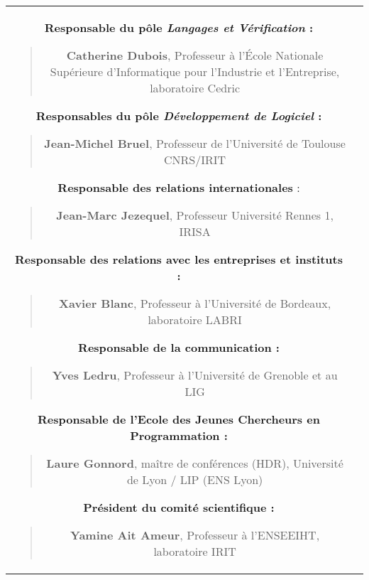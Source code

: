 \documentclass[11pt]{article}
\begin{document}
\begin{small}
\begin{center}
\begin{tabular}{c|c}
\begin{minipage}[t]{.5\textwidth}
  \textbf{Responsable du pôle \textit{Langages et Vérification} :}
  \begin{quote}
     \textbf{Catherine Dubois}, Professeur à l'École Nationale Supérieure d'Informatique pour l'Industrie et l'Entreprise, laboratoire Cedric
  \end{quote}

  \textbf{Responsables du pôle \textit{Développement de Logiciel} :}
    \begin{quote}
      \textbf{Jean-Michel Bruel}, Professeur de l'Université de Toulouse
CNRS/IRIT
     \end{quote}

  \textbf{Responsable des relations internationales} :
    \begin{quote}
      \textbf{Jean-Marc Jezequel}, Professeur Université Rennes 1, IRISA
     \end{quote}
  
  \textbf{Responsable des relations avec les entreprises et instituts :}
   \begin{quote}
      \textbf{Xavier Blanc}, Professeur à l'Université de Bordeaux, laboratoire LABRI
    \end{quote}

    \textbf{Responsable de la communication :}
    \begin{quote}
        \textbf{Yves Ledru}, Professeur à l'Université de Grenoble et au LIG
    \end{quote}

\textbf{Responsable de l'Ecole des Jeunes Chercheurs en Programmation :}
\begin{quote}
  \textbf{Laure Gonnord}, maître de conférences (HDR), Université de Lyon / LIP (ENS Lyon)
  \end{quote}
  
\textbf{Président du comité scientifique :}
\begin{quote}
   \textbf{Yamine Ait Ameur}, Professeur à l'ENSEEIHT, laboratoire IRIT
  \end{quote}
\end{minipage}

\end{tabular}
\end{center}

\end{small}
\medskip

\noindent
\end{document}
